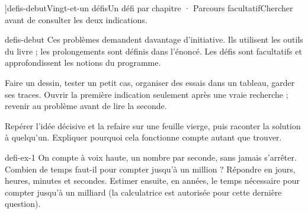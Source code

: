 \editionPage[\pdfbookmark[0]{Défis d’approfondissement}{bm-defis-debut-parent}]{defis-debut}{Vingt-et-un défis}{Un défi par chapitre · Parcours facultatif}{Chercher avant de consulter les deux indications.}
\begin{blocEdition}{defis-debut}
Ces problèmes demandent davantage d’initiative. Ils utilisent les outils du livre ; les prolongements sont définis dans l’énoncé. Les défis sont facultatifs et approfondissent les notions du programme.\par\bigskip
\begin{savoirfaire}Faire un dessin, tester un petit cas, organiser des essais dans un tableau, garder ses traces. Ouvrir la première indication seulement après une vraie recherche ; revenir au problème avant de lire la seconde.\end{savoirfaire}
\begin{savoirfaire}Repérer l’idée décisive et la refaire sur une feuille vierge, puis raconter la solution à quelqu’un. Expliquer pourquoi cela fonctionne compte autant que trouver.\end{savoirfaire}
\end{blocEdition}
\begin{blocEdition}{defi-ex-1}
On compte à voix haute, un nombre par seconde, sans jamais s’arrêter. Combien de temps faut-il pour compter jusqu’à un million ? Répondre en jours, heures, minutes et secondes. Estimer ensuite, en années, le temps nécessaire pour compter jusqu’à un milliard (la calculatrice est autorisée pour cette dernière question).\par{}\par\par{}\par{}\par{}\par{}\par{}\par{}
\end{blocEdition}
